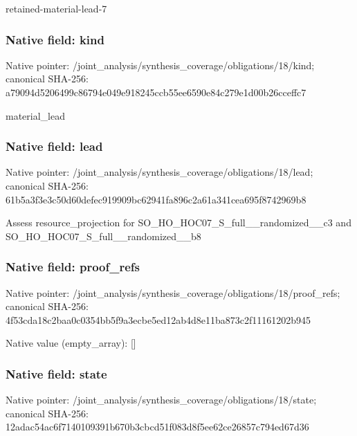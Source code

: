 \documentclass[10pt,a4paper]{article}
\begin{document}
\begingroup\raggedright\sloppy retained-material-lead-7\par\endgroup

\subsubsection{Native field: kind}
Native pointer: /joint\_\allowbreak{}analysis/synthesis\_\allowbreak{}coverage/obligations/18/kind; canonical SHA-256: a79094d5206499c86794e049e918245ccb55ee6590e84c279e1d00b26cceffc7

\begingroup\raggedright\sloppy material\_\allowbreak{}lead\par\endgroup

\subsubsection{Native field: lead}
Native pointer: /joint\_\allowbreak{}analysis/synthesis\_\allowbreak{}coverage/obligations/18/lead; canonical SHA-256: 61b5a3f3e3c50d60defec919909bc62941fa896c2a61a341cea695f8742969b8

\begingroup\raggedright\sloppy Assess resource\_\allowbreak{}projection for SO\_\allowbreak{}HO\_\allowbreak{}HOC07\_\allowbreak{}S\_\allowbreak{}full\_\allowbreak{}\_\allowbreak{}randomized\_\allowbreak{}\_\allowbreak{}c3 and SO\_\allowbreak{}HO\_\allowbreak{}HOC07\_\allowbreak{}S\_\allowbreak{}full\_\allowbreak{}\_\allowbreak{}randomized\_\allowbreak{}\_\allowbreak{}b8\par\endgroup

\subsubsection{Native field: proof\_\allowbreak{}refs}
Native pointer: /joint\_\allowbreak{}analysis/synthesis\_\allowbreak{}coverage/obligations/18/proof\_\allowbreak{}refs; canonical SHA-256: 4f53cda18c2baa0c0354bb5f9a3ecbe5ed12ab4d8e11ba873c2f11161202b945

Native value (empty\_\allowbreak{}array): []

\subsubsection{Native field: state}
Native pointer: /joint\_\allowbreak{}analysis/synthesis\_\allowbreak{}coverage/obligations/18/state; canonical SHA-256: 12adac54ac6f7140109391b670b3cbcd51f083d8f5ee62ce26857c794ed67d36
\end{document}

